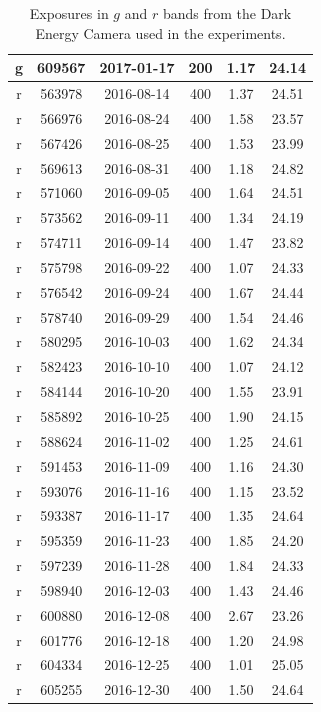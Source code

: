 \documentclass[11pt,letterpaper,linenumbers]{aastex63}
\begin{document}
\begin{table}
\begin{center}
\begin{scriptsize}
\begin{tabular}{cccccc}
      g & 609567 & 2017-01-17 & 200 & 1.17 & 24.14 \\
      \hline
      r & 563978 & 2016-08-14 & 400 & 1.37 & 24.51 \\
      r & 566976 & 2016-08-24 & 400 & 1.58 & 23.57 \\
      r & 567426 & 2016-08-25 & 400 & 1.53 & 23.99 \\
      r & 569613 & 2016-08-31 & 400 & 1.18 & 24.82 \\
      r & 571060 & 2016-09-05 & 400 & 1.64 & 24.51 \\
      r & 573562 & 2016-09-11 & 400 & 1.34 & 24.19 \\
      r & 574711 & 2016-09-14 & 400 & 1.47 & 23.82 \\
      r & 575798 & 2016-09-22 & 400 & 1.07 & 24.33 \\
      r & 576542 & 2016-09-24 & 400 & 1.67 & 24.44 \\
      r & 578740 & 2016-09-29 & 400 & 1.54 & 24.46 \\
      r & 580295 & 2016-10-03 & 400 & 1.62 & 24.34 \\
      r & 582423 & 2016-10-10 & 400 & 1.07 & 24.12 \\
      r & 584144 & 2016-10-20 & 400 & 1.55 & 23.91 \\
      r & 585892 & 2016-10-25 & 400 & 1.90 & 24.15 \\
      r & 588624 & 2016-11-02 & 400 & 1.25 & 24.61 \\
      r & 591453 & 2016-11-09 & 400 & 1.16 & 24.30 \\
      r & 593076 & 2016-11-16 & 400 & 1.15 & 23.52 \\
      r & 593387 & 2016-11-17 & 400 & 1.35 & 24.64 \\
      r & 595359 & 2016-11-23 & 400 & 1.85 & 24.20 \\
      r & 597239 & 2016-11-28 & 400 & 1.84 & 24.33 \\
      r & 598940 & 2016-12-03 & 400 & 1.43 & 24.46 \\
      r & 600880 & 2016-12-08 & 400 & 2.67 & 23.26 \\
      r & 601776 & 2016-12-18 & 400 & 1.20 & 24.98 \\
      r & 604334 & 2016-12-25 & 400 & 1.01 & 25.05 \\
      r & 605255 & 2016-12-30 & 400 & 1.50 & 24.64 \\
      \hline
    \end{tabular}
    \caption{Exposures in $g$ and $r$ bands from the Dark Energy
      Camera used in the experiments.\label{tab:exposures}}
    \end{scriptsize}
  \end{center}
\end{table}
\end{document}

